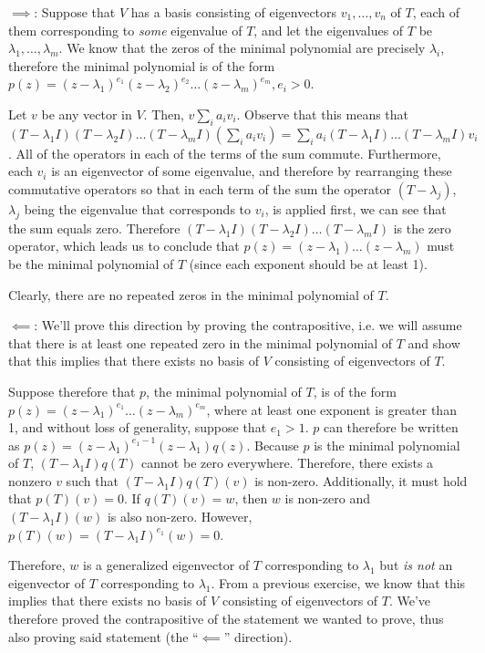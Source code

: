\begin{solution}

    $\implies$: Suppose that $V$ has a basis consisting of eigenvectors $v_1, \ldots, v_n$ of $T$, each of them corresponding to \textit{some} eigenvalue of $T$, and let the eigenvalues of $T$ be $\lambda_1, \ldots, \lambda_m$. We know that the zeros of the minimal polynomial are precisely $\lambda_i$, therefore the minimal polynomial is of the form $p(z) = (z - \lambda_1)^{e_1}(z - \lambda_2)^{e_2}\ldots(z - \lambda_m)^{e_m}, e_i > 0$. 

    Let $v$ be any vector in $V$. Then, $v \sum_i a_i v_i$. Observe that this means that $(T - \lambda_1 I)(T - \lambda_2 I) \ldots (T - \lambda_m I)(\sum_i a_i v_i) = \sum_i a_i (T - \lambda_1 I) \ldots (T - \lambda_m I)v_i$. All of the operators in each of the terms of the sum commute. Furthermore, each $v_i$ is an eigenvector of some eigenvalue, and therefore by rearranging these commutative operators so that in each term of the sum the operator $(T-\lambda_j)$, $\lambda_j$ being the eigenvalue that corresponds to $v_i$, is applied first, we can see that the sum equals zero. Therefore $(T - \lambda_1 I)(T - \lambda_2 I) \ldots (T - \lambda_m I)$ is the zero operator, which leads us to conclude that $p(z) = (z - \lambda_1)\ldots(z - \lambda_m)$ must be the minimal polynomial of $T$ (since each exponent should be at least 1).

    Clearly, there are no repeated zeros in the minimal polynomial of $T$.

    $\impliedby$: We'll prove this direction by proving the contrapositive, i.e. we will assume that there is at least one repeated zero in the minimal polynomial of $T$ and show that this implies that there exists no basis of $V$ consisting of eigenvectors of $T$. 
    
    Suppose therefore that $p$, the minimal polynomial of $T$, is of the form $p(z) = (z - \lambda_1)^{e_1} \ldots (z - \lambda_m)^{e_m}$, where at least one exponent is greater than 1, and without loss of generality, suppose that $e_1 > 1$. $p$ can therefore be written as $p(z) = (z - \lambda_1)^{e_1-1}(z - \lambda_1)q(z)$. Because $p$ is the minimal polynomial of $T$, $(T - \lambda_1 I)q(T)$ cannot be zero everywhere. Therefore, there exists a nonzero $v$ such that $(T - \lambda_1 I)q(T)(v)$ is non-zero. Additionally, it must hold that $p(T)(v) = 0$. If $q(T)(v) = w$, then $w$ is non-zero and $(T-\lambda_1 I) (w)$ is also non-zero. However, $p(T)(w) = (T - \lambda_1 I)^{e_1} (w) = 0$.

    Therefore, $w$ is a generalized eigenvector of $T$ corresponding to $\lambda_1$ but \textit{is not} an eigenvector of $T$ corresponding to $\lambda_1$. From a previous exercise, we know that this implies that there exists no basis of $V$ consisting of eigenvectors of $T$. We've therefore proved the contrapositive of the statement we wanted to prove, thus also proving said statement (the ``$\impliedby$'' direction).
\end{solution}

